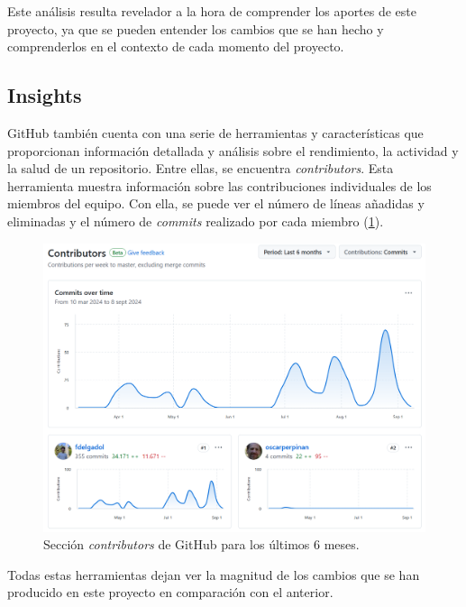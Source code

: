Este análisis resulta revelador a la hora de comprender los aportes de este proyecto, ya que se pueden entender los cambios que se han hecho y comprenderlos en el contexto de cada momento del proyecto.

\subsection{Insights}
\label{sec:orge0d072e}
GitHub también cuenta con una serie de herramientas y características que proporcionan información detallada y análisis sobre el rendimiento, la actividad y la salud de un repositorio. Entre ellas, se encuentra \emph{contributors}. Esta herramienta muestra información sobre las contribuciones individuales de los miembros del equipo. Con ella, se puede ver el número de líneas añadidas y eliminadas y el número de \emph{commits} realizado por cada miembro (\ref{fig:contributors}).
\begin{figure}[htbp]
\centering
\includegraphics[width=.9\linewidth]{figuras/contributors.png}
\caption{Sección \emph{contributors} de GitHub para los últimos 6 meses. \label{fig:contributors}}
\end{figure}

Todas estas herramientas dejan ver la magnitud de los cambios que se han producido en este proyecto en comparación con el anterior.

